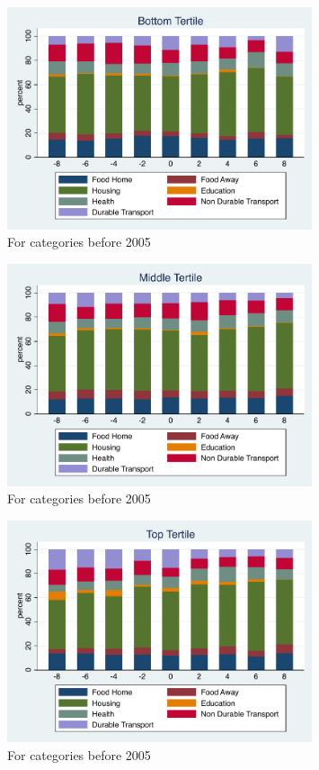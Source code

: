 \documentclass[11pt,onecolumn]{article}
\begin{document}
\begin{figure}[h]
	\caption{For categories before 2005}
	\centering
	\includegraphics[width=0.8\textwidth]{../ConsumptionPostRetirement/Tertile_Bar/tertile1.pdf}
\end{figure}

\begin{figure}[h]
	\caption{For categories before 2005}
	\centering
	\includegraphics[width=0.8\textwidth]{../ConsumptionPostRetirement/Tertile_Bar/tertile2.pdf}
\end{figure}

\begin{figure}[h]
	\caption{For categories before 2005}
	\centering
	\includegraphics[width=0.8\textwidth]{../ConsumptionPostRetirement/Tertile_Bar/tertile3.pdf}
\end{figure}
\end{document}
